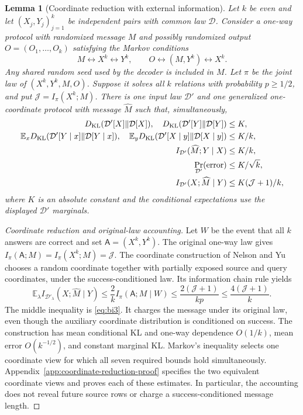 \documentclass[11pt,letterpaper]{article}
\newtheorem{lemma}[theorem]{Lemma}
\numberwithin{equation}{section}
\newcommand{\E}{\mathbb E}
\begin{document}
\begin{lemma}[Coordinate reduction with external information]
\label{lem:external-coordinate}
Let $k$ be even and let $(X_j,Y_j)_{j=1}^k$ be independent pairs with common law $\mathcal D$.
Consider a one-way protocol with randomized message $M$ and possibly randomized output $O=(O_1,\ldots,O_k)$ satisfying the Markov conditions
\[
 M\leftrightarrow X^k\leftrightarrow Y^k,\qquad
 O\leftrightarrow(M,Y^k)\leftrightarrow X^k.
\]
Any shared random seed used by the decoder is included in $M$.
Let $\pi$ be the joint law of $(X^k,Y^k,M,O)$.
Suppose it solves all $k$ relations with probability $p\ge1/2$, and put $\mathcal J=I_\pi(X^k;M)$.
There is one input law $\mathcal D'$ and one generalized one-coordinate protocol with message $\widehat M$ such that, simultaneously,
\begin{equation}
\begin{aligned}
D_{\rm KL}(\mathcal D'[X]\Vert\mathcal D[X]),\quad
 D_{\rm KL}(\mathcal D'[Y]\Vert\mathcal D[Y])&\le K,\\
 \E_xD_{\rm KL}(\mathcal D'[Y\mid x]\Vert\mathcal D[Y\mid x]),
 \quad
 \E_yD_{\rm KL}(\mathcal D'[X\mid y]\Vert\mathcal D[X\mid y])
 &\le K/k,\\
 I_{\mathcal D'}(\widehat M;Y\mid X)&\le K/k,\\
 \Pr_{\mathcal D'}(\text{error})&\le K/\sqrt k,\\
 I_{\mathcal D'}(X;\widehat M\mid Y)&\le K(\mathcal J+1)/k,
\end{aligned}
\label{eq:bi4}
\end{equation}
where $K$ is an absolute constant and the conditional expectations use the displayed $\mathcal D'$ marginals.
\end{lemma}
\begin{proof}[Coordinate reduction and original-law accounting]
Let $W$ be the event that all $k$ answers are correct and set $\mathsf{A}=(X^k,Y^k)$.
The original one-way law gives $I_\pi(\mathsf{A};M)=I_\pi(X^k;M)=\mathcal J$.
The coordinate construction of Nelson and Yu chooses a random coordinate together with partially exposed source and query coordinates, under the success-conditioned law.
Its information chain rule yields
\[
 \E_\lambda I_{\mathcal D'_\lambda}(X;\widehat M\mid Y)
 \le \frac{2}{k}I_\pi(\mathsf{A};M\mid W)
 \le \frac{2(\mathcal J+1)}{kp}
 \le \frac{4(\mathcal J+1)}{k}.
\]
The middle inequality is \eqref{eq:bi3}.
It charges the message under its original law, even though the auxiliary coordinate distribution is conditioned on success.
The construction has mean conditional KL and one-way dependence $O(1/k)$, mean error $O(k^{-1/2})$, and constant marginal KL.
Markov's inequality selects one coordinate view for which all seven required bounds hold simultaneously.
Appendix~\ref{app:coordinate-reduction-proof} specifies the two equivalent coordinate views and proves each of these estimates.
In particular, the accounting does not reveal future source rows or charge a success-conditioned message length.
\end{proof}
\end{document}
